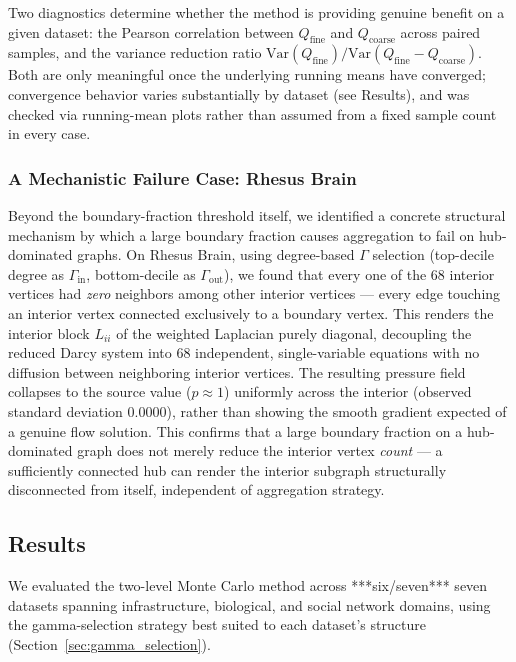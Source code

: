 \documentclass[a4paper,12pt]{amsart}
\numberwithin{equation}{section}
\begin{document}
Two diagnostics determine whether the method is providing genuine 
benefit on a given dataset: the Pearson correlation between 
$Q_{\text{fine}}$ and $Q_{\text{coarse}}$ across paired samples, and 
the variance reduction ratio 
$\mathrm{Var}(Q_{\text{fine}})/\mathrm{Var}(Q_{\text{fine}}-Q_{\text{coarse}})$. 
Both are only meaningful once the underlying running means have 
converged; convergence behavior varies substantially by dataset (see 
Results), and was checked via running-mean plots rather than assumed 
from a fixed sample count in every case.

\subsubsection{A Mechanistic Failure Case: Rhesus Brain}
\label{sec:rhesus}

Beyond the boundary-fraction threshold itself, we identified a 
concrete structural mechanism by which a large boundary fraction 
causes aggregation to fail on hub-dominated graphs. On Rhesus Brain, 
using degree-based $\Gamma$ selection (top-decile degree as 
$\Gamma_{\text{in}}$, bottom-decile as $\Gamma_{\text{out}}$), we found 
that every one of the 68 interior vertices had \emph{zero} neighbors 
among other interior vertices — every edge touching an interior vertex 
connected exclusively to a boundary vertex. This renders the interior 
block $L_{ii}$ of the weighted Laplacian purely diagonal, decoupling 
the reduced Darcy system into 68 independent, single-variable equations 
with no diffusion between neighboring interior vertices. The resulting 
pressure field collapses to the source value ($p \approx 1$) 
uniformly across the interior (observed standard deviation 
$0.0000$), rather than showing the smooth gradient expected of a 
genuine flow solution. This confirms that a large boundary fraction on 
a hub-dominated graph does not merely reduce the interior vertex 
\emph{count} — a sufficiently connected hub can render the interior 
subgraph structurally disconnected from itself, independent of 
aggregation strategy.

\subsection{Results}

We evaluated the two-level Monte Carlo method across ***six/seven*** seven datasets 
spanning infrastructure, biological, and social network domains, 
using the gamma-selection strategy best suited to each dataset's 
structure (Section~\ref{sec:gamma_selection}).
\end{document}
